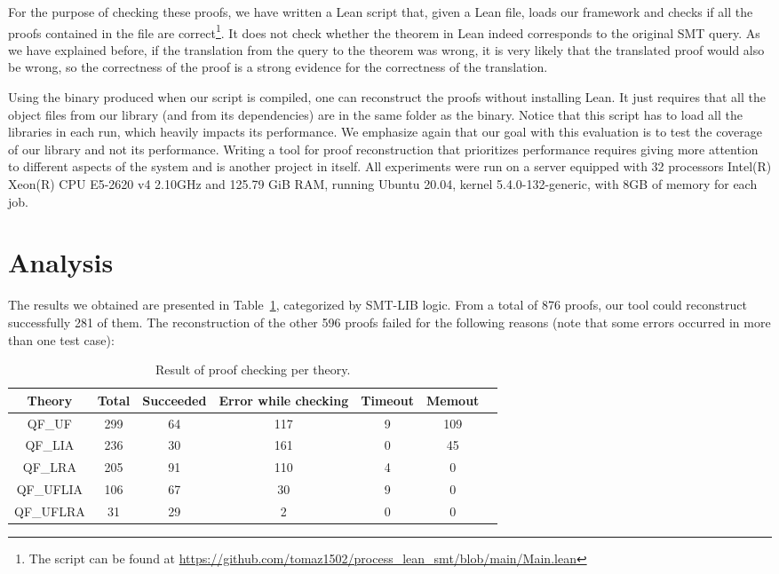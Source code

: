 For the purpose of checking these proofs, we have written a Lean script that, given
a Lean file, loads our framework and checks if all the proofs contained in the file
are correct\footnote{The script can
  be found at \url{https://github.com/tomaz1502/process_lean_smt/blob/main/Main.lean}}.
%
It does not check whether the theorem in Lean indeed corresponds to the original SMT query.
%
As we have explained before, if the translation from the query to the theorem was wrong,
it is very likely that the translated proof would also be wrong, so the correctness
of the proof is a strong evidence for the correctness of the translation.

Using the binary produced when our script is compiled, one can reconstruct the
proofs without installing Lean.
%
It just requires that all the object files from our library (and from its dependencies)
are in the same folder as the binary.
%
Notice that this script has to load all the libraries in each run, which heavily impacts
its performance.
%
We emphasize again that our goal with this evaluation is to test the coverage of our
library and not its performance.
%
Writing a tool for proof reconstruction that prioritizes performance requires
giving more attention to different aspects of the system and is another
project in itself.
%
All experiments were run on a server equipped with 32 processors Intel(R) Xeon(R)
CPU E5-2620 v4 2.10GHz and 125.79 GiB RAM, running Ubuntu 20.04,
kernel 5.4.0-132-generic, with 8GB of memory for each job.

\section{Analysis}

The results we obtained are presented in Table~\ref{results_rcons}, categorized
by SMT-LIB logic. From a total of 876 proofs, our tool could reconstruct
successfully 281 of them. The reconstruction of the other 596 proofs
failed for the following reasons (note that some errors occurred in more than one test case):

\begin{table}[t]
\centering
\begin{tabular}{ c c c c c c c }
\toprule
Theory  & Total   & Succeeded & Error while checking & Timeout & Memout \\ \midrule
QF\_UF    & 299   & 64    & 117     & 9       & 109  \\ \midrule
QF\_LIA   & 236   & 30    & 161     & 0       & 45   \\ \midrule
QF\_LRA   & 205   & 91    & 110     & 4       & 0    \\ \midrule
QF\_UFLIA & 106   & 67    & 30      & 9       & 0    \\ \midrule
QF\_UFLRA & 31    & 29    & 2       & 0       & 0    \\ \bottomrule
\end{tabular}
\caption{Result of proof checking per theory.}\label{results_rcons}
\end{table}

